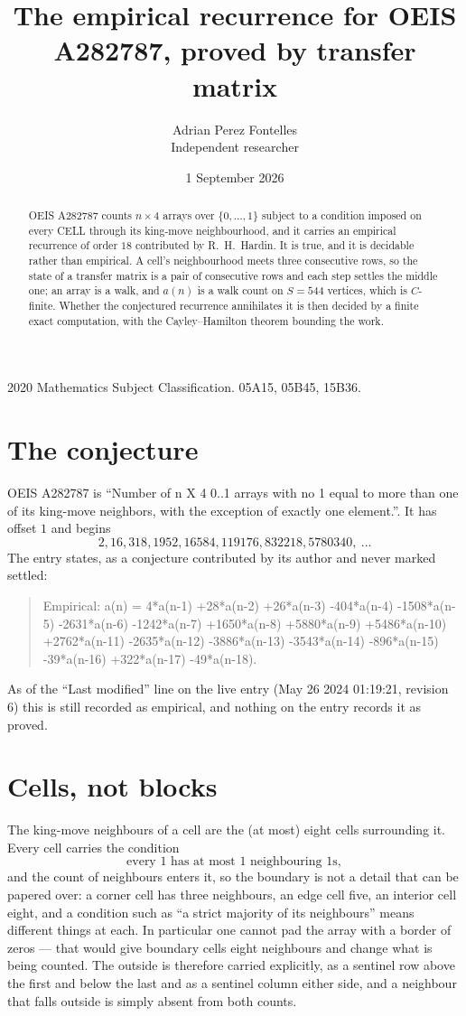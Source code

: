 \documentclass[11pt,a4paper]{article}
\title{The empirical recurrence for OEIS A282787, proved by transfer matrix}
\author{Adrian Perez Fontelles\\ \small Independent researcher}
\date{1 September 2026}
\theoremstyle{plain}
\theoremstyle{definition}
\begin{document}
\maketitle

\begin{abstract}
OEIS A282787 counts $n\times4$ arrays over $\{0,\dots,1\}$ subject to a condition imposed on
every CELL through its king-move neighbourhood, and it carries an empirical recurrence of
order $18$ contributed by R.~H.~Hardin. It is true, and it is decidable rather than
empirical. A cell's neighbourhood meets three consecutive rows, so the state of a transfer
matrix is a pair of consecutive rows and each step settles the middle one; an array is a
walk, and $a(n)$ is a walk count on $S=544$ vertices, which is $C$-finite. Whether the
conjectured recurrence annihilates it is then decided by a finite exact computation, with the
Cayley--Hamilton theorem bounding the work.
\end{abstract}

\noindent\small 2020 Mathematics Subject Classification. 05A15, 05B45, 15B36.\normalsize

\section{The conjecture}

OEIS A282787 is ``Number of n X 4 0..1 arrays with no 1 equal to more than one of its king-move neighbors, with the exception of exactly one element.''. It has offset $1$ and begins
\[
2, 16, 318, 1952, 16584, 119176, 832218, 5780340,\ \dots
\]
The entry states, as a conjecture contributed by its author and never marked settled:
\begin{quote}
Empirical: a(n) = 4*a(n-1) +28*a(n-2) +26*a(n-3) -404*a(n-4) -1508*a(n-5) -2631*a(n-6) -1242*a(n-7) +1650*a(n-8) +5880*a(n-9) +5486*a(n-10) +2762*a(n-11) -2635*a(n-12) -3886*a(n-13) -3543*a(n-14) -896*a(n-15) -39*a(n-16) +322*a(n-17) -49*a(n-18).
\end{quote}
As of the ``Last modified'' line on the live entry (May 26 2024 01:19:21, revision 6) this is still
recorded as empirical, and nothing on the entry records it as proved.

\section{Cells, not blocks}

The king-move neighbours of a cell are the (at most) eight cells surrounding it. Every cell
carries the condition
\[
\text{every }1\text{ has at most }1\text{ neighbouring }1\text{s},
\]
and the count of neighbours enters it, so the boundary is not a detail that can be papered
over: a corner cell has three neighbours, an edge cell five, an interior cell eight, and a
condition such as ``a strict majority of its neighbours'' means different things at each. In
particular one cannot pad the array with a border of zeros --- that would give boundary cells
eight neighbours and change what is being counted. The outside is therefore carried
explicitly, as a sentinel row above the first and below the last and as a sentinel column
either side, and a neighbour that falls outside is simply absent from both counts.
\end{document}
